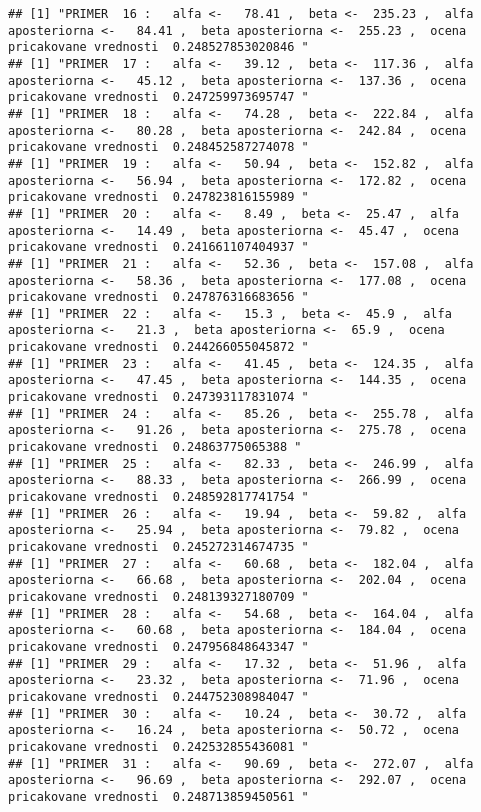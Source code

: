 \documentclass[
]{article}
\begin{document}
\begin{verbatim}
## [1] "PRIMER  16 :   alfa <-   78.41 ,  beta <-  235.23 ,  alfa aposteriorna <-   84.41 ,  beta aposteriorna <-  255.23 ,  ocena pricakovane vrednosti  0.248527853020846 "
## [1] "PRIMER  17 :   alfa <-   39.12 ,  beta <-  117.36 ,  alfa aposteriorna <-   45.12 ,  beta aposteriorna <-  137.36 ,  ocena pricakovane vrednosti  0.247259973695747 "
## [1] "PRIMER  18 :   alfa <-   74.28 ,  beta <-  222.84 ,  alfa aposteriorna <-   80.28 ,  beta aposteriorna <-  242.84 ,  ocena pricakovane vrednosti  0.248452587274078 "
## [1] "PRIMER  19 :   alfa <-   50.94 ,  beta <-  152.82 ,  alfa aposteriorna <-   56.94 ,  beta aposteriorna <-  172.82 ,  ocena pricakovane vrednosti  0.247823816155989 "
## [1] "PRIMER  20 :   alfa <-   8.49 ,  beta <-  25.47 ,  alfa aposteriorna <-   14.49 ,  beta aposteriorna <-  45.47 ,  ocena pricakovane vrednosti  0.241661107404937 "
## [1] "PRIMER  21 :   alfa <-   52.36 ,  beta <-  157.08 ,  alfa aposteriorna <-   58.36 ,  beta aposteriorna <-  177.08 ,  ocena pricakovane vrednosti  0.247876316683656 "
## [1] "PRIMER  22 :   alfa <-   15.3 ,  beta <-  45.9 ,  alfa aposteriorna <-   21.3 ,  beta aposteriorna <-  65.9 ,  ocena pricakovane vrednosti  0.244266055045872 "
## [1] "PRIMER  23 :   alfa <-   41.45 ,  beta <-  124.35 ,  alfa aposteriorna <-   47.45 ,  beta aposteriorna <-  144.35 ,  ocena pricakovane vrednosti  0.247393117831074 "
## [1] "PRIMER  24 :   alfa <-   85.26 ,  beta <-  255.78 ,  alfa aposteriorna <-   91.26 ,  beta aposteriorna <-  275.78 ,  ocena pricakovane vrednosti  0.24863775065388 "
## [1] "PRIMER  25 :   alfa <-   82.33 ,  beta <-  246.99 ,  alfa aposteriorna <-   88.33 ,  beta aposteriorna <-  266.99 ,  ocena pricakovane vrednosti  0.248592817741754 "
## [1] "PRIMER  26 :   alfa <-   19.94 ,  beta <-  59.82 ,  alfa aposteriorna <-   25.94 ,  beta aposteriorna <-  79.82 ,  ocena pricakovane vrednosti  0.245272314674735 "
## [1] "PRIMER  27 :   alfa <-   60.68 ,  beta <-  182.04 ,  alfa aposteriorna <-   66.68 ,  beta aposteriorna <-  202.04 ,  ocena pricakovane vrednosti  0.248139327180709 "
## [1] "PRIMER  28 :   alfa <-   54.68 ,  beta <-  164.04 ,  alfa aposteriorna <-   60.68 ,  beta aposteriorna <-  184.04 ,  ocena pricakovane vrednosti  0.247956848643347 "
## [1] "PRIMER  29 :   alfa <-   17.32 ,  beta <-  51.96 ,  alfa aposteriorna <-   23.32 ,  beta aposteriorna <-  71.96 ,  ocena pricakovane vrednosti  0.244752308984047 "
## [1] "PRIMER  30 :   alfa <-   10.24 ,  beta <-  30.72 ,  alfa aposteriorna <-   16.24 ,  beta aposteriorna <-  50.72 ,  ocena pricakovane vrednosti  0.242532855436081 "
## [1] "PRIMER  31 :   alfa <-   90.69 ,  beta <-  272.07 ,  alfa aposteriorna <-   96.69 ,  beta aposteriorna <-  292.07 ,  ocena pricakovane vrednosti  0.248713859450561 "

\end{verbatim}
\end{document}
